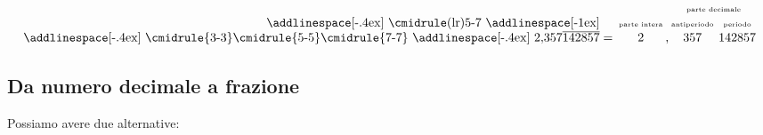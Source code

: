 \[\setlength{\tabcolsep}{1pt}
\begin{tabular}{r@{}cccccc}
&&&&\multicolumn{3}{c}{\tiny parte decimale}\\
\addlinespace[-.4ex]
\cmidrule(lr){5-7}
\addlinespace[-1ex]
&&\tiny parte intera&&\tiny antiperiodo&&\tiny periodo\\
\addlinespace[-.4ex]
\cmidrule{3-3}\cmidrule{5-5}\cmidrule{7-7}
\addlinespace[-.4ex]
$2{,}357\overline{142857}$&${}={}$&$2$&,&$357$&&$142857$
\end{tabular}
\]
\subsection{Da numero decimale a frazione}
Possiamo avere due alternative:
